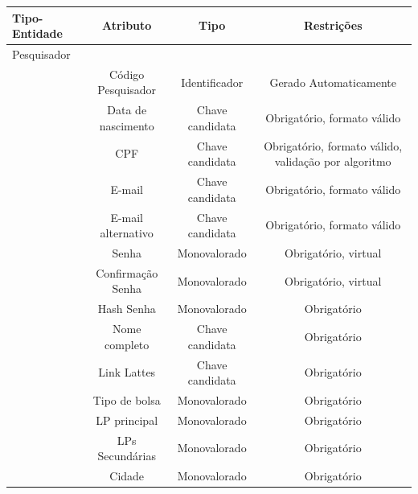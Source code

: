 \documentclass[11pt]{../../classes/ifscarticle}
\begin{document}
\begin{table}[h]
  \centering
  \vspace{0.5cm}
  \begin{tabular}{l|c|c|c|}
    Tipo-Entidade & Atributo & Tipo & Restrições \\ %
    \hline                               %
    Pesquisador \\
                  & Código Pesquisador  & Identificador     & Gerado Automaticamente                               \\
                  & Data de nascimento  & Chave candidata   & Obrigatório, formato válido                          \\
                  & CPF                 & Chave candidata   & Obrigatório, formato válido, validação por algoritmo \\
                  & E-mail              & Chave candidata   & Obrigatório, formato válido                          \\
                  & E-mail alternativo  & Chave candidata   & Obrigatório, formato válido                          \\
                  & Senha               & Monovalorado      & Obrigatório, virtual                                 \\
                  & Confirmação Senha   & Monovalorado      & Obrigatório, virtual                                 \\
                  & Hash Senha          & Monovalorado      & Obrigatório                                          \\
                  & Nome completo       & Chave candidata   & Obrigatório                                          \\
                  & Link Lattes         & Chave candidata   & Obrigatório                                          \\
                  & Tipo de bolsa       & Monovalorado      & Obrigatório                                          \\
                  & LP principal        & Monovalorado      & Obrigatório                                          \\
                  & LPs Secundárias     & Monovalorado      & Obrigatório                                          \\
                  & Cidade              & Monovalorado      & Obrigatório                                          \\

\end{tabular}
\end{table}
\end{document}
